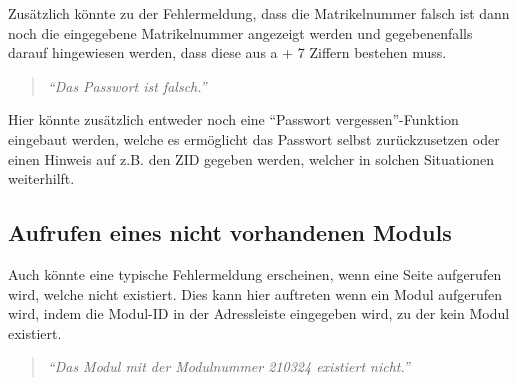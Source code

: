 \documentclass[a4paper,10pt]{scrartcl}
\begin{document}
Zusätzlich könnte zu der Fehlermeldung, dass die Matrikelnummer falsch ist dann noch die eingegebene Matrikelnummer angezeigt werden und gegebenenfalls darauf hingewiesen
werden, dass diese aus a + 7 Ziffern bestehen muss.

\begin{quote}
\emph{``Das Passwort ist falsch.''}
\end{quote} 

 \noindent{}
 \medskip

Hier könnte zusätzlich entweder noch eine ``Passwort vergessen''-Funktion eingebaut werden, welche es ermöglicht das Passwort selbst zurückzusetzen oder einen
Hinweis auf z.B. den ZID gegeben werden, welcher in solchen Situationen weiterhilft.

\subsection{Aufrufen eines nicht vorhandenen Moduls}

Auch könnte eine typische Fehlermeldung erscheinen, wenn eine Seite aufgerufen wird, welche nicht existiert. Dies kann hier auftreten wenn ein Modul aufgerufen wird, indem die Modul-ID in der Adressleiste
eingegeben wird, zu der kein Modul existiert.

\begin{quote}
\emph{``Das Modul mit der Modulnummer 210324 existiert nicht.''}
\end{quote} 

 \noindent{}
\end{document}
